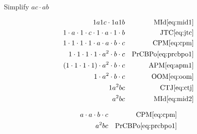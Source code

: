 \begin{example}[id:20141108-192234] \label{20141108-192234}  \hfill \\

Simplify $ac \cdot ab$

\soln

\solnsteps
\begin{align*}
1a1c \cdot 1a1b && \text{MId} \eqref{eq:mid1} \\
1 \cdot a \cdot 1 \cdot c \cdot 1 \cdot a \cdot 1 \cdot b && \text{JTC} \eqref{eq:jtc} \\
1 \cdot 1 \cdot 1 \cdot 1 \cdot a \cdot a \cdot b \cdot c && \text{CPM} \eqref{eq:cpm} \\
1 \cdot 1 \cdot 1 \cdot 1 \cdot a^2 \cdot b \cdot c && \text{PrCBPo} \eqref{eq:prcbpo1} \\
(1 \cdot 1 \cdot 1 \cdot 1) \cdot a^2 \cdot b \cdot c && \text{APM} \eqref{eq:apm1} \\
1 \cdot a^2 \cdot b \cdot c && \text{OOM} \eqref{eq:oom} \\
1 a^2bc && \text{CTJ} \eqref{eq:ctj} \\
a^2bc && \text{MId} \eqref{eq:mid2} 
\end{align*}

\soln

\lesssteps
\begin{align*}
a \cdot a \cdot b \cdot c && \text{CPM} \eqref{eq:cpm} \\
a^2bc && \text{PrCBPo} \eqref{eq:prcbpo1} 
\end{align*}

\end{example}

